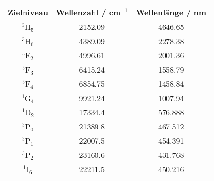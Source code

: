 \begin{center}
\begin{tabular}{|c|c|c|}
\hline
Zielniveau & Wellenzahl / cm$^{-1}$ & Wellenlänge / nm \\ \hline
$^3$H$_5$ & 2152.09 & 4646.65 \\ \hline
$^3$H$_6$ & 4389.09 & 2278.38 \\ \hline
$^3$F$_2$ & 4996.61 & 2001.36 \\ \hline
$^3$F$_3$ & 6415.24 & 1558.79 \\ \hline
$^3$F$_4$ & 6854.75 & 1458.84 \\ \hline
$^1$G$_4$ & 9921.24 & 1007.94 \\ \hline
$^1$D$_2$ & 17334.4 & 576.888 \\ \hline
$^3$P$_0$ & 21389.8 & 467.512 \\ \hline
$^3$P$_1$ & 22007.5 & 454.391 \\ \hline
$^3$P$_2$ & 23160.6 & 431.768 \\ \hline
$^1$I$_6$ & 22211.5 & 450.216 \\ \hline
\end{tabular}
\end{center}